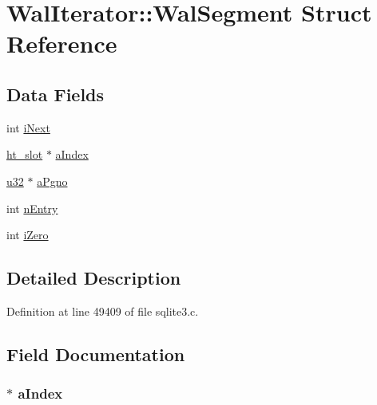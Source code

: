 \hypertarget{struct_wal_iterator_1_1_wal_segment}{}\section{Wal\+Iterator\+:\+:Wal\+Segment Struct Reference}
\label{struct_wal_iterator_1_1_wal_segment}
\subsection*{Data Fields}
\begin{DoxyCompactItemize}
\item 
int \hyperlink{struct_wal_iterator_1_1_wal_segment_a7055b113747e55de4bbbf2e0acea4c9f}{i\+Next}
\item 
\hyperlink{sqlite3_8c_ad66c3d273a53aab13bb1bc02f2d9e990}{ht\+\_\+slot} $\ast$ \hyperlink{struct_wal_iterator_1_1_wal_segment_a5217a2ddf91c733121988d6233647a84}{a\+Index}
\item 
\hyperlink{sqlite3_8c_a03ad5adfaeb9b7640dde78a0cc390319}{u32} $\ast$ \hyperlink{struct_wal_iterator_1_1_wal_segment_a7307f0b8f06bf14ab630326f96ea5410}{a\+Pgno}
\item 
int \hyperlink{struct_wal_iterator_1_1_wal_segment_a9eea28d16cd908667d461e0e7e09fb53}{n\+Entry}
\item 
int \hyperlink{struct_wal_iterator_1_1_wal_segment_ab7e86018ffe08ff695a3f7fe9f268de6}{i\+Zero}
\end{DoxyCompactItemize}


\subsection{Detailed Description}


Definition at line 49409 of file sqlite3.\+c.



\subsection{Field Documentation}
\hypertarget{struct_wal_iterator_1_1_wal_segment_a5217a2ddf91c733121988d6233647a84}{}
\subsubsection[{a\+Index}]{$\ast$ a\+Index}\label{struct_wal_iterator_1_1_wal_segment_a5217a2ddf91c733121988d6233647a84}


